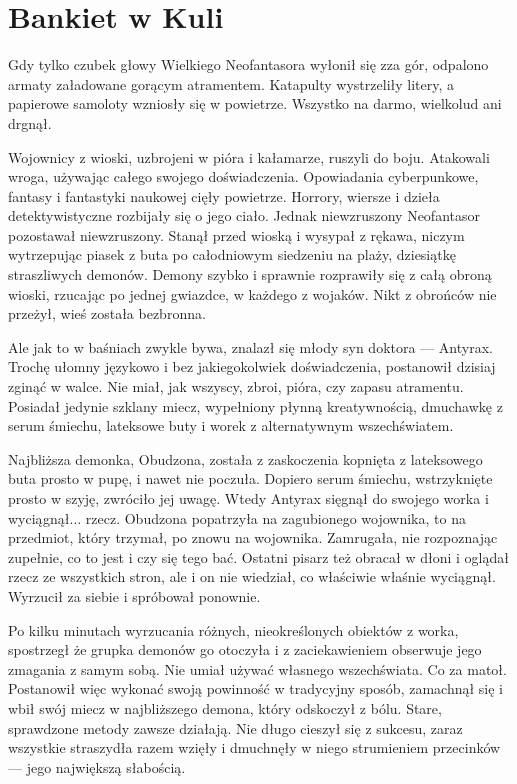 \chapter{Bankiet w Kuli}


Gdy tylko czubek głowy Wielkiego Neofantasora wyłonił się zza gór, odpalono armaty załadowane gorącym atramentem.
Katapulty wystrzeliły litery, a papierowe samoloty wzniosły się w powietrze.
Wszystko na darmo, wielkolud ani drgnął.

Wojownicy z wioski, uzbrojeni w pióra i kałamarze, ruszyli do boju.
Atakowali wroga, używając całego swojego doświadczenia. Opowiadania cyberpunkowe, fantasy i fantastyki naukowej cięły powietrze.
Horrory, wiersze i dzieła detektywistyczne rozbijały się o jego ciało.
Jednak niewzruszony Neofantasor pozostawał niewzruszony.
Stanął przed wioską i wysypał z rękawa, niczym wytrzepując piasek z buta po całodniowym siedzeniu na plaży, dziesiątkę straszliwych demonów.
Demony szybko i sprawnie rozprawiły się z całą obroną wioski, rzucając po jednej gwiazdce, w każdego z wojaków.
Nikt z obrońców nie przeżył, wieś została bezbronna.

Ale jak to w baśniach zwykle bywa, znalazł się młody syn doktora --- Antyrax.
Trochę ułomny językowo i bez jakiegokolwiek doświadczenia, postanowił dzisiaj zginąć w walce.
Nie miał, jak wszyscy, zbroi, pióra, czy zapasu atramentu.
Posiadał jedynie szklany miecz, wypełniony płynną kreatywnością, dmuchawkę z serum śmiechu, lateksowe buty i worek z alternatywnym wszechświatem.

Najbliższa demonka, Obudzona, została z zaskoczenia kopnięta z lateksowego buta prosto w pupę, i nawet nie poczuła.
Dopiero serum śmiechu, wstrzyknięte prosto w szyję, zwróciło jej uwagę.
Wtedy Antyrax sięgnął do swojego worka i wyciągnął... rzecz.
Obudzona popatrzyła na zagubionego wojownika, to na przedmiot, który trzymał, po znowu na wojownika. Zamrugała, nie rozpoznając zupełnie, co to jest i czy się tego bać.
Ostatni pisarz też obracał w dłoni i oglądał rzecz ze wszystkich stron, ale i on nie wiedział, co właściwie właśnie wyciągnął.
Wyrzucił za siebie i spróbował ponownie.

Po kilku minutach wyrzucania różnych, nieokreślonych obiektów z worka, spostrzegł że grupka demonów go otoczyła i z zaciekawieniem obserwuje jego zmagania z samym sobą.
Nie umiał używać własnego wszechświata. Co za matoł.
Postanowił więc wykonać swoją powinność w tradycyjny sposób, zamachnął się i wbił swój miecz w najbliższego demona, który odskoczył z bólu. Stare, sprawdzone metody zawsze działają.
Nie długo cieszył się z sukcesu, zaraz wszystkie straszydła razem wzięły i dmuchnęły w niego strumieniem przecinków --- jego największą słabością.

